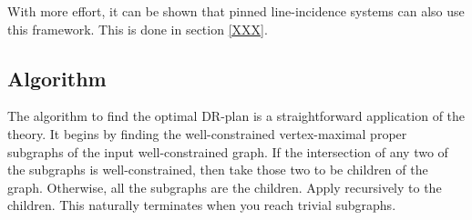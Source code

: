 With more effort, it can be shown that pinned line-incidence systems can also use this framework. This is done in section \ref{XXX}.



\subsection{Algorithm}
The algorithm to find the optimal DR-plan is a straightforward application of the theory. It begins by finding the well-constrained vertex-maximal proper subgraphs of the input well-constrained graph. If the intersection of any two of the subgraphs is well-constrained, then take those two to be children of the graph. Otherwise, all the subgraphs are the children. Apply recursively to the children. This naturally terminates when you reach trivial subgraphs.
